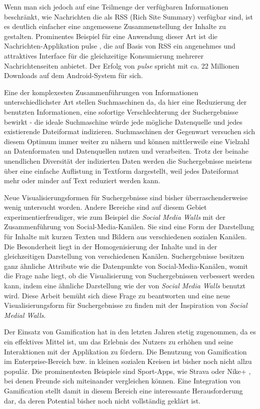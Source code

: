 \documentclass[12pt,twoside]{book}
\begin{document}
Wenn man sich jedoch auf eine Teilmenge der verfügbaren Informationen beschränkt, wie Nachrichten die als RSS (Rich Site Summary) verfügbar sind, ist es deutlich einfacher eine angemessene Zusammenstellung der Inhalte zu gestalten. Prominentes Beispiel für eine Anwendung dieser Art ist die Nachrichten-Applikation pulse \cite{pulse}, die auf Basis von RSS ein angenehmes und attraktives Interface für die gleichzeitige Konsumierung mehrerer Nachrichtenseiten anbietet. Der Erfolg von \textit{pulse} spricht mit ca. 22 Millionen Downloads auf dem Android-System für sich.

Eine der komplexesten Zusammenführungen von Informationen unterschiedlichster Art stellen Suchmaschinen da, da hier eine Reduzierung der benutzten Informationen, eine sofortige Verschlechterung der Suchergebnisse bewirkt - die ideale Suchmaschine würde jede mögliche Datenquelle und jedes existierende Dateiformat indizieren.
Suchmaschinen der Gegenwart versuchen sich diesem Optimum immer weiter zu nähern und können mittlerweile eine Vielzahl an Datenformaten und Datenquellen nutzen und verarbeiten.
Trotz der beinahe unendlichen Diversität der indizierten Daten werden die Suchergebnisse meistens über eine einfache Auflistung in Textform dargestellt, weil jedes Dateiformat mehr oder minder auf Text reduziert werden kann.

Neue Visualisierungsformen für Suchergebnisse sind bisher überraschenderweise wenig untersucht worden. Andere Bereiche sind auf diesem Gebiet experimentierfreudiger, wie zum Beispiel die \textit{Social Media Walls} mit der Zusammenführung von Social-Media-Kanälen.
Sie sind eine Form der Darstellung für Inhalte mit kurzen Texten und Bildern aus verschiedenen sozialen Kanälen. Die Besonderheit liegt in der Homogenisierung der Inhalte und in der gleichzeitigen Darstellung von verschiedenen Kanälen.
Suchergebnisse besitzen ganz ähnliche Attribute wie die Datenpunkte von Social-Media-Kanälen, womit die Frage nahe liegt, ob die Visualisierung von Suchergebnissen verbessert werden kann, indem eine ähnliche Darstellung wie der von \textit{Social Media Walls} benutzt wird.
Diese Arbeit bemüht sich diese Frage zu beantworten und eine neue Visualisierungsform für Suchergebnisse zu finden mit der Inspiration von \textit{Social Medial Walls}.

Der Einsatz von Gamification hat in den letzten Jahren stetig zugenommen, da es ein effektives Mittel ist, um das Erlebnis des Nutzers zu erhöhen und seine Interaktionen mit der Applikation zu fördern.
Die Benutzung von Gamification im Enterprise-Bereich bzw. in kleinen sozialen Kreisen ist bisher noch nicht allzu populär. Die prominentesten Beispiele sind Sport-Apps, wie Strava \cite{strava} oder Nike+ \cite{nike}, bei denen Freunde sich miteinander vergleichen können. Eine Integration von Gamification stellt damit in diesem Bereich eine interessante Herausforderung dar, da deren Potential bisher noch nicht vollständig geklärt ist.
\end{document}
